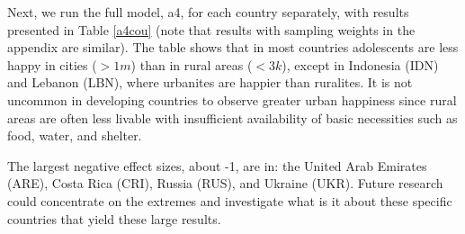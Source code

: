\documentclass[11pt, letterpaper]{article}
\begin{document}
\begin{spacing}{1.9}
Next, we run the full model, a4, for each country separately, with results
presented in Table \ref{a4cou} (note that results with sampling weights in the appendix
are similar). The table shows that in most countries adolescents are less happy
in cities ($>1m$) than in rural areas ($<3k$), except in Indonesia (IDN) and
Lebanon (LBN), where urbanites are happier than ruralites. {It is not uncommon in developing countries to observe greater
urban happiness since rural areas are often less livable with insufficient availability of basic necessities such as food, water, and shelter.}%
 
The largest negative effect sizes, about -1, are in: the United Arab Emirates (ARE), Costa Rica (CRI), Russia (RUS), and Ukraine (UKR). 
Future research could concentrate on the extremes and investigate what is it
about these specific countries that yield these large results. 


\end{spacing}
\end{document}
